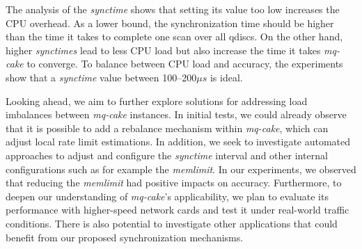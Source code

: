 %
The analysis of the \textit{synctime} shows that setting its value too low increases the CPU overhead.
%
As a lower bound, the synchronization time should be higher than the time it takes to complete one scan over all qdiscs.
%
On the other hand, higher \textit{synctimes} lead to less CPU load but also increase the time it takes \textit{mq-cake} to converge.
%
To balance between CPU load and accuracy, the experiments show that a \textit{synctime} value between 100--200$\mu s$ is ideal.

Looking ahead, we aim to further explore solutions for addressing load imbalances between \textit{mq-cake} instances.
%
In initial tests, we could already observe that it is possible to add a rebalance mechanism within \textit{mq-cake}, which can adjust local rate limit estimations.
%
In addition, we seek to investigate automated approaches to adjust and configure the \textit{synctime} interval and other internal configurations such as for example the \textit{memlimit}.
%
In our experiments, we observed that reducing the \textit{memlimit} had positive impacts on accuracy.
%
Furthermore, to deepen our understanding of \textit{mq-cake}'s applicability, we plan to evaluate its performance with higher-speed network cards and test it under real-world traffic conditions.
%
There is also potential to investigate other applications that could benefit from our proposed synchronization mechanisms.
